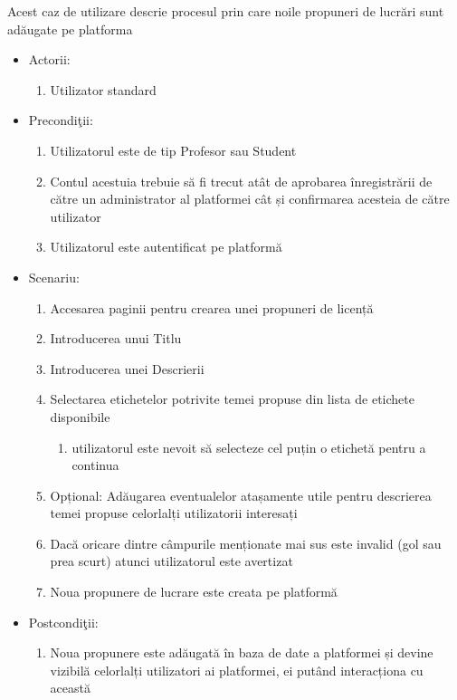 \documentclass[12pt,a4paper,hidelinks]{report}
\theoremstyle{definition}
\theoremstyle{remark}
\begin{document}
Acest caz de utilizare descrie procesul prin care noile propuneri de lucrări sunt adăugate pe platforma
\begin{itemize}
    \item{Actorii:
        \begin{enumerate}
            \item Utilizator standard
        \end{enumerate}}
    \item{Precondi\c tii:
        \begin{enumerate}
            \item Utilizatorul este de tip Profesor sau Student
            \item Contul acestuia trebuie să fi trecut atât de aprobarea înregistrării de către un administrator al platformei cât și confirmarea acesteia de către utilizator
            \item Utilizatorul este autentificat pe platformă
        \end{enumerate}}
    \item{Scenariu:
        \begin{enumerate}
            \item Accesarea paginii pentru crearea unei propuneri de licență
            \item Introducerea unui Titlu
            \item Introducerea unei Descrierii
            \item {Selectarea etichetelor potrivite temei propuse din lista de etichete disponibile
                \begin{enumerate}
                    \item utilizatorul este nevoit să selecteze cel puțin o etichetă pentru a continua
                \end{enumerate}}
            \item Opțional: Adăugarea eventualelor atașamente utile pentru descrierea temei propuse celorlalți utilizatorii interesați
            \item Dacă oricare dintre câmpurile menționate mai sus este invalid (gol sau prea scurt) atunci utilizatorul este avertizat
            \item Noua propunere de lucrare este creata pe platformă
        \end{enumerate}}
    \item{Postcondi\c tii:
        \begin{enumerate}
            \item Noua propunere este adăugată în baza de date a platformei și devine vizibilă celorlalți utilizatori ai platformei, ei putând interacționa cu această
        \end{enumerate}}
\end{itemize}
\end{document}
